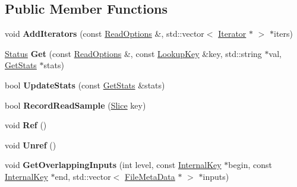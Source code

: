 \subsection*{Public Member Functions}
\begin{DoxyCompactItemize}
\item 
\mbox{\label{classleveldb_1_1_version_a035a0fa5bfe7ab84a711b1138b0b9a3d}} 
void {\bfseries Add\+Iterators} (const \mbox{\hyperlink{structleveldb_1_1_read_options}{Read\+Options}} \&, std\+::vector$<$ \mbox{\hyperlink{classleveldb_1_1_iterator}{Iterator}} $\ast$ $>$ $\ast$iters)
\item 
\mbox{\label{classleveldb_1_1_version_a42c439d4a2a767fe281c7a75d4255038}} 
\mbox{\hyperlink{classleveldb_1_1_status}{Status}} {\bfseries Get} (const \mbox{\hyperlink{structleveldb_1_1_read_options}{Read\+Options}} \&, const \mbox{\hyperlink{classleveldb_1_1_lookup_key}{Lookup\+Key}} \&key, std\+::string $\ast$val, \mbox{\hyperlink{structleveldb_1_1_version_1_1_get_stats}{Get\+Stats}} $\ast$stats)
\item 
\mbox{\label{classleveldb_1_1_version_a7e5b8451deb7c4b9006fd9d5ccfc2cef}} 
bool {\bfseries Update\+Stats} (const \mbox{\hyperlink{structleveldb_1_1_version_1_1_get_stats}{Get\+Stats}} \&stats)
\item 
\mbox{\label{classleveldb_1_1_version_a8b9e51b3d0503fe5868f656356557ded}} 
bool {\bfseries Record\+Read\+Sample} (\mbox{\hyperlink{classleveldb_1_1_slice}{Slice}} key)
\item 
\mbox{\label{classleveldb_1_1_version_ad237b446c7f7d9e63c4b7c162d6f0064}} 
void {\bfseries Ref} ()
\item 
\mbox{\label{classleveldb_1_1_version_a3f623697f625d4740d5b273c0bf6223a}} 
void {\bfseries Unref} ()
\item 
\mbox{\label{classleveldb_1_1_version_afd86dffba7ce5229778bddd546517392}} 
void {\bfseries Get\+Overlapping\+Inputs} (int level, const \mbox{\hyperlink{classleveldb_1_1_internal_key}{Internal\+Key}} $\ast$begin, const \mbox{\hyperlink{classleveldb_1_1_internal_key}{Internal\+Key}} $\ast$end, std\+::vector$<$ \mbox{\hyperlink{structleveldb_1_1_file_meta_data}{File\+Meta\+Data}} $\ast$ $>$ $\ast$inputs)

\end{DoxyCompactItemize}
